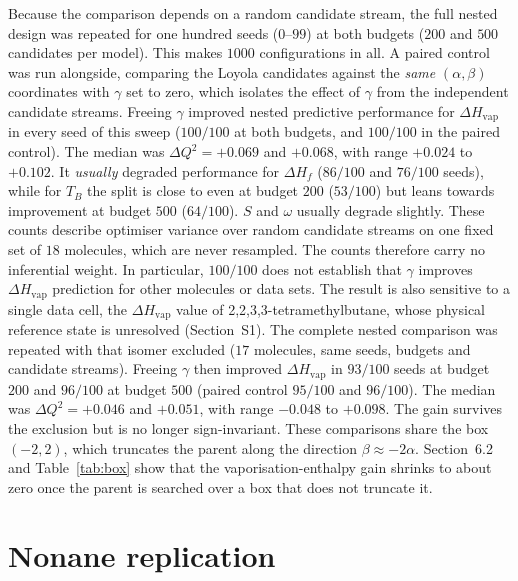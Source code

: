 \documentclass[a5paper, 10pt]{article}
\theoremstyle{plain}
\theoremstyle{remark}
\theoremstyle{definition}
\begin{document}
Because the comparison depends on a random candidate stream, the full
nested design was repeated for one hundred seeds ($0$--$99$) at both
budgets ($200$ and $500$ candidates per model). This makes $1000$
configurations in all. A paired control was run alongside, comparing
the Loyola candidates against the \emph{same} $(\alpha,\beta)$
coordinates with $\gamma$ set to zero, which isolates the effect of
$\gamma$ from the independent candidate streams. Freeing
$\gamma$ improved nested predictive performance for
$\Delta H_{\mathrm{vap}}$ in every seed of this sweep ($100/100$ at
both budgets, and $100/100$ in the paired control). The median was
$\Delta Q^2 = +0.069$ and $+0.068$, with range $+0.024$ to $+0.102$.
It \emph{usually} degraded performance for $\Delta H_f$ ($86/100$ and
$76/100$ seeds), while for $T_B$ the split is close to even at budget
$200$ ($53/100$) but leans towards improvement at budget $500$
($64/100$). $S$ and $\omega$ usually degrade slightly. These counts
describe optimiser variance over random candidate streams on one fixed
set of $18$ molecules, which are never resampled. The counts therefore
carry no inferential weight. In particular, $100/100$ does not establish that
$\gamma$ improves $\Delta H_{\mathrm{vap}}$ prediction for other
molecules or data sets. The result is also sensitive to a single data
cell, the $\Delta H_{\mathrm{vap}}$ value of 2,2,3,3-tetramethylbutane,
whose physical reference state is unresolved (Section~S1). The
complete nested comparison was repeated with that isomer excluded
($17$ molecules, same seeds, budgets and candidate streams). Freeing
$\gamma$ then improved $\Delta H_{\mathrm{vap}}$ in $93/100$ seeds at
budget $200$ and $96/100$ at budget $500$ (paired control $95/100$ and
$96/100$). The median was $\Delta Q^2 = +0.046$ and $+0.051$, with
range $-0.048$ to $+0.098$. The gain survives the exclusion but is no
longer sign-invariant.
These comparisons share the box $(-2,2)$, which truncates the parent
along the direction $\beta \approx -2\alpha$. Section~6.2 and
Table~\ref{tab:box} show that the
vaporisation-enthalpy gain shrinks to about zero once the parent is
searched over a box that does not truncate it.

\section{Nonane replication}\label{sec:s-external}
\end{document}
